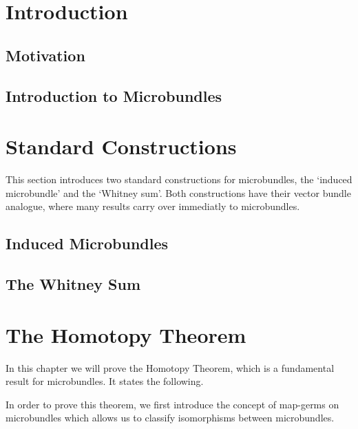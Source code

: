 \documentclass{article}
\begin{document}


\tableofcontents
\clearpage
\section{Introduction}\label{chapter::introduction}
\subsection*{Motivation}\label{section::motivation}{\blankbreak}

\subsection*{Introduction to Microbundles}\label{section::microbundle}{\blankbreak}

\section{Standard Constructions}\label{chapter::constructions}
\begin{myparagraph}
    This section introduces two standard constructions for microbundles,
    the `induced microbundle' and the `Whitney sum'.
    Both constructions have their vector bundle analogue,
    where many results carry over immediatly to microbundles.
\end{myparagraph}
\subsection*{Induced Microbundles}\label{section::induced}{\blankbreak}

\subsection*{The Whitney Sum}\label{section::whitney}

\section{The Homotopy Theorem}\label{chapter::homotopy}
\begin{myparagraph}
    In this chapter we will prove the Homotopy Theorem,
    which is a fundamental result for microbundles.
    It states the following.
\end{myparagraph}

\begin{myparagraph}
    In order to prove this theorem,
    we first introduce the concept of map-germs
    on microbundles which allows us to classify
    isomorphisms between microbundles.
\end{myparagraph}


\end{document}
